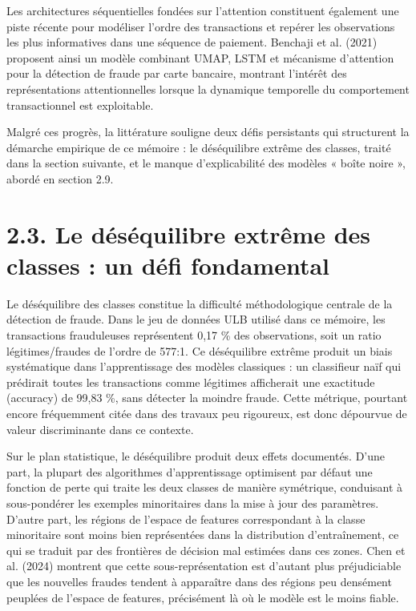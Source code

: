 Les architectures séquentielles fondées sur l'attention constituent également une piste récente pour modéliser l'ordre des transactions et repérer les observations les plus informatives dans une séquence de paiement. Benchaji et al. (2021) proposent ainsi un modèle combinant UMAP, LSTM et mécanisme d'attention pour la détection de fraude par carte bancaire, montrant l'intérêt des représentations attentionnelles lorsque la dynamique temporelle du comportement transactionnel est exploitable.

Malgré ces progrès, la littérature souligne deux défis persistants qui structurent la démarche empirique de ce mémoire : le déséquilibre extrême des classes, traité dans la section suivante, et le manque d'explicabilité des modèles « boîte noire », abordé en section 2.9.

\section{2.3. Le déséquilibre extrême des classes : un défi fondamental}

Le déséquilibre des classes constitue la difficulté méthodologique centrale de la détection de fraude. Dans le jeu de données ULB utilisé dans ce mémoire, les transactions frauduleuses représentent 0,17 \% des observations, soit un ratio légitimes/fraudes de l'ordre de 577:1. Ce déséquilibre extrême produit un biais systématique dans l'apprentissage des modèles classiques : un classifieur naïf qui prédirait toutes les transactions comme légitimes afficherait une exactitude (accuracy) de 99,83 \%, sans détecter la moindre fraude. Cette métrique, pourtant encore fréquemment citée dans des travaux peu rigoureux, est donc dépourvue de valeur discriminante dans ce contexte.

Sur le plan statistique, le déséquilibre produit deux effets documentés. D'une part, la plupart des algorithmes d'apprentissage optimisent par défaut une fonction de perte qui traite les deux classes de manière symétrique, conduisant à sous-pondérer les exemples minoritaires dans la mise à jour des paramètres. D'autre part, les régions de l'espace de features correspondant à la classe minoritaire sont moins bien représentées dans la distribution d'entraînement, ce qui se traduit par des frontières de décision mal estimées dans ces zones. Chen et al. (2024) montrent que cette sous-représentation est d'autant plus préjudiciable que les nouvelles fraudes tendent à apparaître dans des régions peu densément peuplées de l'espace de features, précisément là où le modèle est le moins fiable.

